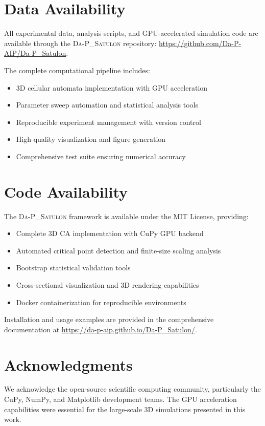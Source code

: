 \documentclass[twocolumn,showpacs,preprintnumbers,amsmath,amssymb,prb]{revtex4-2}
\newcommand{\satulon}{\textsc{Da-P\_Satulon}}
\begin{document}
\section*{Data Availability}

All experimental data, analysis scripts, and GPU-accelerated simulation code are available through the \satulon{} repository: \url{https://github.com/Da-P-AIP/Da-P_Satulon}. 

The complete computational pipeline includes:
\begin{itemize}
\item 3D cellular automata implementation with GPU acceleration
\item Parameter sweep automation and statistical analysis tools
\item Reproducible experiment management with version control
\item High-quality visualization and figure generation
\item Comprehensive test suite ensuring numerical accuracy
\end{itemize}

\section*{Code Availability}

The \satulon{} framework is available under the MIT License, providing:
\begin{itemize}
\item Complete 3D CA implementation with CuPy GPU backend
\item Automated critical point detection and finite-size scaling analysis
\item Bootstrap statistical validation tools
\item Cross-sectional visualization and 3D rendering capabilities
\item Docker containerization for reproducible environments
\end{itemize}

Installation and usage examples are provided in the comprehensive documentation at \url{https://da-p-aip.github.io/Da-P_Satulon/}.

\section*{Acknowledgments}

We acknowledge the open-source scientific computing community, particularly the CuPy, NumPy, and Matplotlib development teams. The GPU acceleration capabilities were essential for the large-scale 3D simulations presented in this work.
\end{document}

